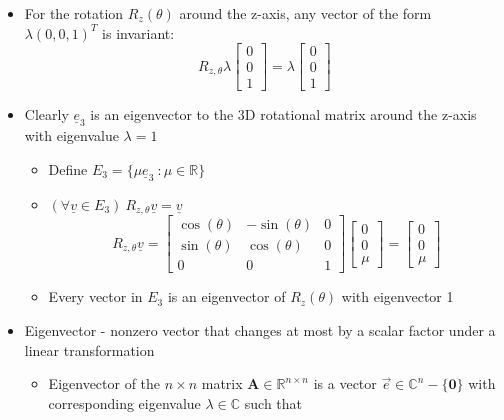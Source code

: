 \documentclass{article}
\begin{document}
\begin{itemize}
\begin{itemize}
\begin{itemize}
        \end{itemize}
    \end{itemize}
    \item For the rotation $R_z(\theta)$ around the z-axis, any vector of the form $\lambda(0,0,1)^T$ is invariant:
    \[
    R_{z,\theta}\lambda\left[ \begin{array}{c}
        0 \\
        0 \\
        1
    \end{array} \right] = \lambda \left[ \begin{array}{c}
        0 \\
        0 \\
        1
    \end{array} \right]
    \]
    \item Clearly $\underline{e}_3$ is an eigenvector to the 3D rotational matrix around the z-axis with eigenvalue $\lambda = 1$
    \begin{itemize}
        \item Define $E_3 = \{\mu\underline{e}_3\ : \mu \in \mathbb{R}\}$
        \item $(\forall \underline{v} \in E_3) \ R_{z,\theta} \underline{v} = \underline{v}$
        \[
        R_{z,\theta} \underline{v} = \left[ \begin{array}{ccc}
                \cos(\theta) & -\sin(\theta) & 0 \\
                \sin(\theta) & \cos(\theta) & 0 \\
                0 & 0 & 1
            \end{array} \right] \left[ \begin{array}{c}
                0 \\ 0 \\ \mu
            \end{array} \right] = \left[ \begin{array}{c}
                0 \\ 0 \\ \mu
            \end{array} \right]
        \]
        \item Every vector in $E_3$ is an eigenvector of $R_z(\theta)$ with eigenvector 1
    \end{itemize}
    \item Eigenvector - nonzero vector that changes at most by a scalar factor under a linear transformation
    \begin{itemize}
        \item Eigenvector of the $n \times n$ matrix $\bm{A} \in \mathbb{R}^{n \times n}$ is a vector $\vec{e} \in \mathbb{C}^n - \{ \bm{0} \}$ with corresponding eigenvalue $\lambda \in \mathbb{C}$ such that

\end{itemize}
\end{itemize}
\end{document}

